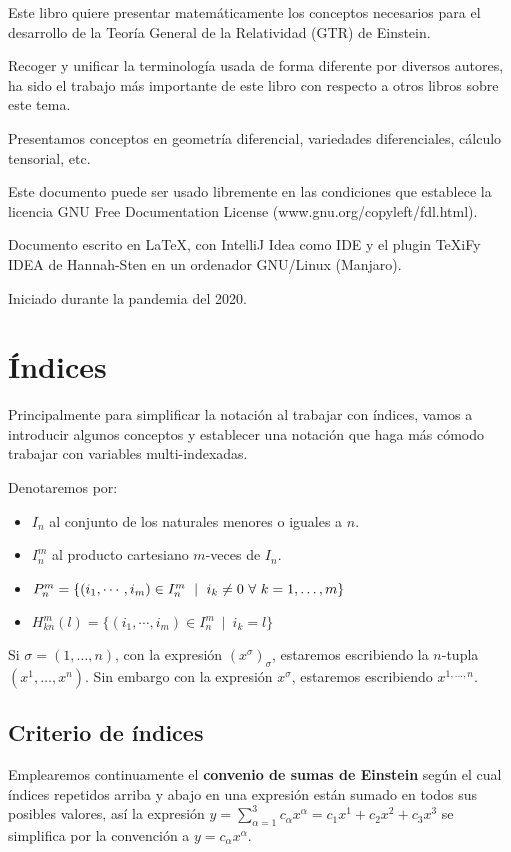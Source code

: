 Este libro quiere presentar matemáticamente los conceptos necesarios para el desarrollo de la Teoría General de la
Relatividad (GTR) de Einstein.

Recoger y unificar la terminología usada de forma diferente por diversos autores, ha sido el trabajo más importante
de este libro con respecto a otros libros sobre este tema.

Presentamos conceptos en geometría diferencial, variedades diferenciales, cálculo tensorial, etc.

Este documento puede ser usado libremente en las condiciones que establece la licencia GNU Free Documentation License
(www.gnu.org/copyleft/fdl.html).

Documento escrito en \LaTeX, con IntelliJ Idea como IDE y el plugin TeXiFy IDEA
de Hannah-Sten en un ordenador GNU/Linux (Manjaro).

Iniciado durante la pandemia del 2020.


\section{\'Indices}\label{sec:indices}
Principalmente para simplificar la notación al trabajar con índices, vamos
a introducir algunos conceptos y establecer una notación que haga más cómodo
trabajar con variables multi-indexadas.

\begin{notation}
  Denotaremos por:
  \begin{itemize}
    \item $I_n$ al conjunto de los naturales menores o iguales a $n$.
    \item $I_n^m$ al producto cartesiano $m$-veces de $I_n$.
    \item $P_n^m=\{(i_1,\cdots,i_m)\in I_n^m\ \mid \ i_k\neq 0\ \forall\ \indexdots{k}{1}{m}\}$
    \item $H_{kn}^m(l)=\{(i_1,\cdots,i_m)\in I_n^m\ \mid \ i_k=l\}$
  \end{itemize}
\end{notation}

\begin{notation}
  Si $\sigma=(1,\ldots,n)$, con la expresión $(x^\sigma)_\sigma$, estaremos escribiendo la $n$-tupla $(x^1,\ldots,
  x^n)$.
  Sin embargo con la expresión $x^\sigma$, estaremos escribiendo $x^{1,\ldots,n}$.
\end{notation}

\subsection{Criterio de índices}\label{subsec:criterio-de-indices}

Emplearemos continuamente el \textbf{convenio de sumas de Einstein} según el cual
índices repetidos arriba y abajo en una expresión están sumado en todos sus posibles valores,
así la expresión $y=\sum_{\alpha=1}^3 c_\alpha x^\alpha=c_1 x^1 + c_2 x^2 + c_3 x^3$
se simplifica por la convención a $y = c_\alpha x^\alpha$.
